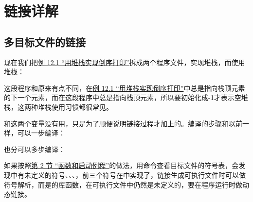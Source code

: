 

\chapter{链接详解}
%





\section{多目标文件的链接}
%
现在我们把\hyperlink{db.ch12s02.id2749908}{例 12.\BookSplit{}1 “用堆栈实现倒序打印”}拆成两个程序文件，实现堆栈，而使用堆栈：




这段程序和原来有点不同，在\hyperlink{db.ch12s02.id2749908}{例 12.\BookSplit{}1 “用堆栈实现倒序打印”}中总是指向栈顶元素的下一个元素，而在这段程序中总是指向栈顶元素，所以要初始化成-1才表示空堆栈，这两种堆栈使用习惯都很常见。




和这两个变量没有用，只是为了顺便说明链接过程才加上的。编译的步骤和以前一样，可以一步编译：




也分可以多步编译：




如果按照\hyperlink{db.ch19s02.id2776173}{第 2 节 “函数和启动例程”}的做法，用命令查看目标文件的符号表，会发现中有未定义的符号、、、，前三个符号在中实现了，链接生成可执行文件时可以做符号解析，而是的库函数，在可执行文件中仍然是未定义的，要在程序运行时做动态链接。



